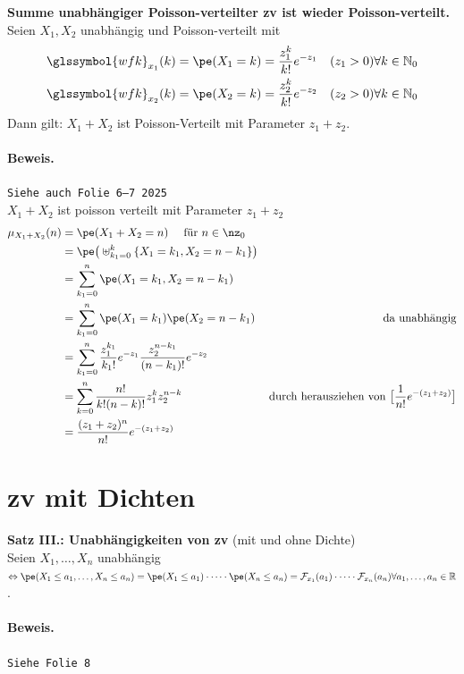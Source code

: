 \begin{satz}
    \textbf{Summe unabhängiger Poisson-verteilter \gls{zv} ist wieder Poisson-verteilt.}  
    \\
    Seien $X_1, X_2$ unabhängig und Poisson-verteilt mit
    \begin{align*}
        \glssymbol{wfk}_{x_1}(k) = \pe(X_1 = k) & = \frac{z_1^k}{k!} e^{-z_1} & (z_1 > 0) \forall k \in \mathbb{N}_0 \\
        \glssymbol{wfk}_{x_2}(k) = \pe(X_2 = k) & = \frac{z_2^k}{k!} e^{-z_2} & (z_2 > 0) \forall k \in \mathbb{N}_0
    \end{align*}
    Dann gilt: $X_1 + X_2$ ist Poisson-Verteilt mit Parameter $z_1 + z_2$.

    \paragraph{Beweis.} \texttt{Siehe auch Folie 6--7 2025} \\
    $X_1 + X_2$ ist poisson verteilt mit Parameter $z_1 + z_2 $
    \begin{align*}
        \mu_{X_1 + X_2}(n) & = \pe(X_1 + X_2 = n) \quad \text{ für } n \in \nz_0 \\
        & = \pe \big( \uplus^k_{k_1 = 0} \{ X_1 = k_1 , X_2 = n - k_1\} \big) \\
        & = \sum^n_{k_1=0} \pe(X_1 = k_1, X_2 = n - k_1) \\
        & = \sum^n_{k_1=0} \pe(X_1 = k_1) \pe(X_2 = n - k_1) & \text{da unabhängig} \\
        & = \sum^n_{k_1=0} \frac{z_1^{k_1}}{k_1 !} e^{-z_1} \frac{z_2^{n-k_1}}{(n-k_1)!} e^{-z_2} \\
        & = \sum^n_{k=0} \frac{n!}{k! (n-k)!} z_1^k z_2^{n-k} & \text{durch herausziehen von }
        \big[ \frac{1}{n!} e^{-(z_1 + z_2)} \big] \\
        & = \frac{(z_1 + z_2)^n}{n!} e^{-(z_1 + z_2)}
    \end{align*}
\end{satz}



\section{\gls{zv} mit Dichten}\label{sec:zv-mit-dichten}

\begin{satz}
    \textbf{Satz III.: Unabhängigkeiten von \gls{zv}} (mit und ohne Dichte)   \\
    Seien $X_1, \dots, X_n$ unabhängig $ \Leftrightarrow \pe(X_1 \leq a_1, \dots, X_n \leq a_n) = \pe(X_1 \leq a_1) \cdot \dots \cdot  \pe(X_n \leq a_n) = \mathcal{F}_{x_1}(a_1) \cdot \dots \cdot \mathcal{F}_{x_n}(a_n) \forall a_1, \dots, a_n \in \mathbb{R}$.

    \paragraph{Beweis.}
    \texttt{Siehe Folie 8}
\end{satz}


